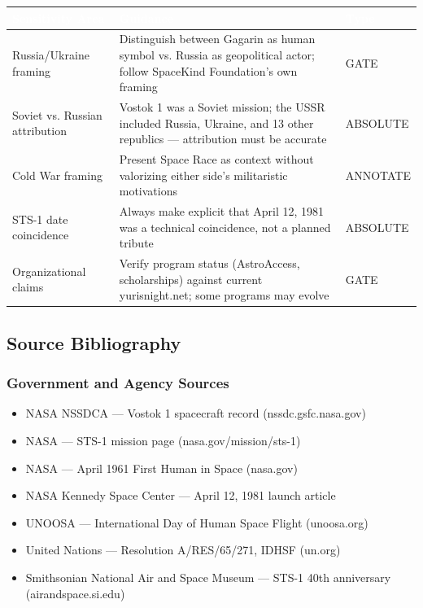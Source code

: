 \documentclass[11pt,letterpaper]{article}
\newcommand{\tableheader}[1]{\textbf{\sffamily\textcolor{white}{#1}}}
\begin{document}
\begin{center}
\begin{tabularx}{\textwidth}{L{3.5cm}XC{2cm}}
\toprule
{}
\tableheader{Sensitivity Area} & \tableheader{Guidance} & \tableheader{Type} \\
\midrule
Russia/Ukraine framing & Distinguish between Gagarin as human symbol vs. Russia as geopolitical actor; follow SpaceKind Foundation's own framing & GATE \\
Soviet vs. Russian attribution & Vostok 1 was a Soviet mission; the USSR included Russia, Ukraine, and 13 other republics — attribution must be accurate & ABSOLUTE \\
Cold War framing & Present Space Race as context without valorizing either side's militaristic motivations & ANNOTATE \\
STS-1 date coincidence & Always make explicit that April 12, 1981 was a technical coincidence, not a planned tribute & ABSOLUTE \\
Organizational claims & Verify program status (AstroAccess, scholarships) against current yurisnight.net; some programs may evolve & GATE \\
\bottomrule
\end{tabularx}
\end{center}

\subsection{Source Bibliography}

\subsubsection{Government and Agency Sources}
\begin{itemize}[leftmargin=*]
  \item NASA NSSDCA — Vostok 1 spacecraft record (nssdc.gsfc.nasa.gov)
  \item NASA — STS-1 mission page (nasa.gov/mission/sts-1)
  \item NASA — April 1961 First Human in Space (nasa.gov)
  \item NASA Kennedy Space Center — April 12, 1981 launch article
  \item UNOOSA — International Day of Human Space Flight (unoosa.org)
  \item United Nations — Resolution A/RES/65/271, IDHSF (un.org)
  \item Smithsonian National Air and Space Museum — STS-1 40th anniversary (airandspace.si.edu)
\end{itemize}
\end{document}
